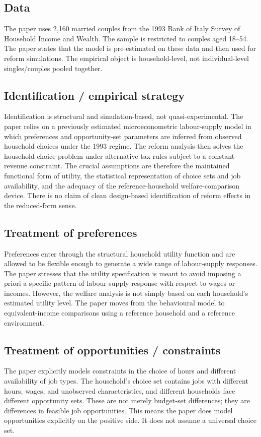 \documentclass[11pt,a4paper]{article}
\begin{document}
\subsection*{Data}
The paper uses 2,160 married couples from the 1993 Bank of Italy Survey of Household Income and Wealth. The sample is restricted to couples aged 18–54. The paper states that the model is pre-estimated on these data and then used for reform simulations. The empirical object is household-level, not individual-level singles/couples pooled together.

\subsection*{Identification / empirical strategy}
Identification is structural and simulation-based, not quasi-experimental. The paper relies on a previously estimated microeconometric labour-supply model in which preferences and opportunity-set parameters are inferred from observed household choices under the 1993 regime. The reform analysis then solves the household choice problem under alternative tax rules subject to a constant-revenue constraint. The crucial assumptions are therefore the maintained functional form of utility, the statistical representation of choice sets and job availability, and the adequacy of the reference-household welfare-comparison device. There is no claim of clean design-based identification of reform effects in the reduced-form sense.

\subsection*{Treatment of preferences}
Preferences enter through the structural household utility function and are allowed to be flexible enough to generate a wide range of labour-supply responses. The paper stresses that the utility specification is meant to avoid imposing a priori a specific pattern of labour-supply response with respect to wages or incomes. However, the welfare analysis is not simply based on each household’s estimated utility level. The paper moves from the behavioural model to equivalent-income comparisons using a reference household and a reference environment.

\subsection*{Treatment of opportunities / constraints}
The paper explicitly models constraints in the choice of hours and different availability of job types. The household’s choice set contains jobs with different hours, wages, and unobserved characteristics, and different households face different opportunity sets. These are not merely budget-set differences; they are differences in feasible job opportunities. This means the paper does model opportunities explicitly on the positive side. It does not assume a universal choice set.
\end{document}
